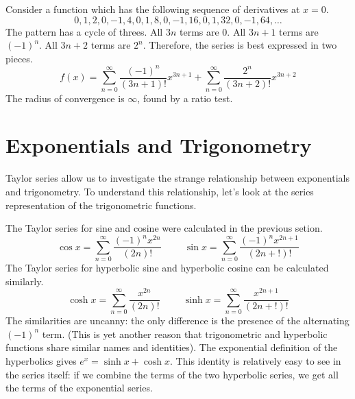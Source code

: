 \documentclass[fleqn,letterpaper]{report}
\begin{document}
\begin{example}
Consider a function which has the following sequence of
derivatives at $x=0$.
\begin{equation*}
0, 1, 2, 0, -1, 4, 0, 1, 8, 0, -1, 16, 0, 1, 32, 0, -1, 64,
\ldots
\end{equation*}
The pattern has a cycle of threes. All $3n$ terms are 0. All
$3n+1$ terms are $(-1)^n$. All $3n+2$ terms are $2^n$.
Therefore, the series is best expressed in two pieces.
\begin{equation*}
f(x) = 
\sum_{n=0}^\infty \frac{(-1)^n}{(3n+1)!} x^{3n+1} + 
\sum_{n=0}^\infty \frac{2^n}{(3n+2)!} x^{3n+2} 
\end{equation*}
The radius of convergence is $\infty$, found by a ratio test.
\end{example}

\section{Exponentials and Trigonometry} 
\label{exponentials-and-trigonometry}

Taylor series allow us to investigate the strange relationship
between exponentials and trigonometry. To understand this
relationship, let's look at the series representation of the
trigonometric functions. 

The Taylor series for sine and cosine were calculated in the
previous setion.
\begin{equation*}
\cos x = \sum_{n=0}^\infty \frac{(-1)^nx^{2n}}{(2n)!} \hspace{1cm}
\sin x = \sum_{n=0}^\infty \frac{(-1)^nx^{2n+1}}{(2n+!)!}
\end{equation*}
The Taylor series for hyperbolic sine and hyperbolic cosine
can be calculated similarly.
\begin{equation*}
\cosh x = \sum_{n=0}^\infty \frac{x^{2n}}{(2n)!} \hspace{1cm}
\sinh x = \sum_{n=0}^\infty \frac{x^{2n+1}}{(2n+!)!}
\end{equation*}
The similarities are uncanny: the only difference is the
presence of the alternating $(-1)^n$ term. (This is yet
another reason that trigonometric and hyperbolic functions
share similar names and identities). 
The exponential definition of the hyperbolics gives
$e^x = \sinh x + \cosh x$. This identity is relatively
easy to see in the series itself: if we combine the terms
of the two hyperbolic series, we get all the terms of the
exponential series. 
\end{document}
